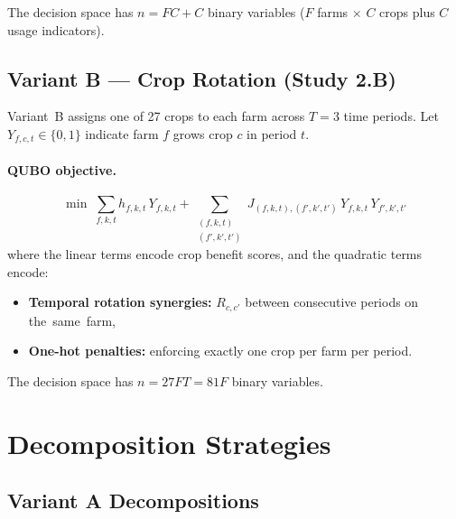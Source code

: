 \documentclass[11pt,a4paper]{article}
\begin{document}
The decision space has $n = FC + C$ binary variables ($F$ farms $\times$ $C$ crops
plus $C$ usage indicators).

\subsection{Variant B --- Crop Rotation (Study 2.B)}
\label{sec:varB}

Variant~B assigns one of 27 crops to each farm across $T=3$ time periods.
Let $Y_{f,c,t}\in\{0,1\}$ indicate farm $f$ grows crop $c$ in period $t$.

\paragraph{QUBO objective.}
\begin{equation}
\min \;\sum_{f,k,t} h_{f,k,t}\,Y_{f,k,t}
  + \sum_{\substack{(f,k,t)\\(f',k',t')}} J_{(f,k,t),(f',k',t')}\,Y_{f,k,t}\,Y_{f',k',t'}
\label{eq:obj-B}
\end{equation}
where the linear terms encode crop benefit scores, and the
quadratic terms encode:
\begin{itemize}
  \item \textbf{Temporal rotation synergies:} $R_{c,c'}$ between consecutive periods
    on the~same~farm,
  \item \textbf{One-hot penalties:} enforcing exactly one crop per farm per period.
\end{itemize}

The decision space has $n = 27FT = 81F$ binary variables.

\section{Decomposition Strategies}
\label{sec:decompositions}

\subsection{Variant A Decompositions}
\end{document}
